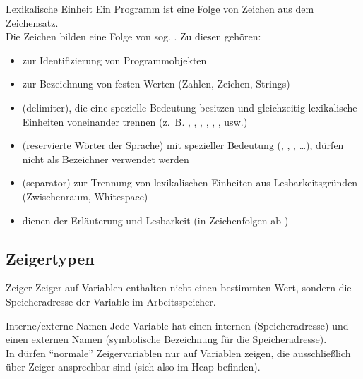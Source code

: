 \begin{Def}{Lexikalische Einheit}
    Ein Programm ist eine Folge von Zeichen aus dem Zeichensatz. \\
    Die Zeichen bilden eine Folge von sog. .
    Zu diesen gehören:
    \begin{itemize}
        \item {} zur Identifizierung von Programmobjekten
        
        \item {} zur Bezeichnung von festen Werten
        (Zahlen, Zeichen, Strings)
        
        \item {} (delimiter), die eine spezielle Bedeutung
        besitzen und gleichzeitig lexikalische Einheiten voneinander trennen
        (z.~B. \adacode{\&}, , \adacode{+}, \adacode{(},
        \adacode{)}, \adacode{:=}, \adacode{>=} usw.)
        
        \item {} (reservierte Wörter der Sprache) mit
        spezieller Bedeutung (, , \linebreak
        , \dots),
        dürfen nicht als Bezeichner verwendet werden
        
        \item {} (separator) zur Trennung von lexikalischen
        Einheiten aus Lesbarkeitsgründen (Zwischenraum, Whitespace)
        
        \item {} dienen der Erläuterung und Lesbarkeit
        (in \Ada{} Zeichenfolgen ab \adacode{{-}{-}})
    \end{itemize}
\end{Def}

\addtocounter{subsection}{1}

\subsection{%
    Zeigertypen%
}

\begin{Def}{Zeiger}
    Zeiger auf Variablen enthalten nicht einen bestimmten Wert, sondern die
    Speicheradresse der Variable im Arbeitsspeicher.
\end{Def}

\begin{Def}{Interne/externe Namen}
    Jede Variable hat einen internen (Speicheradresse) und einen externen
    Namen (symbolische Bezeichnung für die Speicheradresse). \\
    In \Ada{} dürfen "`normale"' Zeigervariablen nur auf Variablen zeigen, die
    ausschließlich über Zeiger ansprechbar sind (sich also im Heap befinden).
\end{Def}

